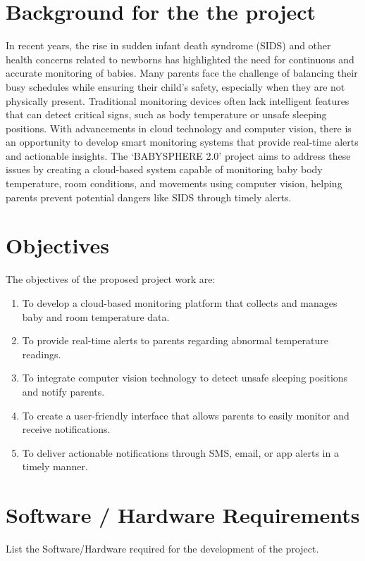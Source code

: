\documentclass[12pt,a4paper]{report}
\begin{document}
\section*{Background for the  the project}
In recent years\cite{banerjee2002minimum}, the rise in sudden infant death syndrome (SIDS)
 and other health concerns related to newborns has highlighted 
 the need for continuous and accurate monitoring of babies. 
 Many parents face the challenge of balancing their busy 
 schedules while ensuring their child’s safety, especially when 
 they are not physically present. Traditional monitoring devices
  often lack intelligent features that can detect critical signs,
   such as body temperature or unsafe sleeping positions. With 
   advancements in cloud technology and computer vision, there 
   is an opportunity to develop smart monitoring systems that 
   provide real-time alerts and actionable insights. The 
   `BABYSPHERE 2.0' project aims to address these issues by 
   creating a cloud-based system capable of monitoring baby 
   body temperature, room conditions, and movements using 
   computer vision, helping parents prevent potential dangers 
   like SIDS through timely alerts.

\section*{Objectives }
The objectives of the proposed project work are:
\begin{enumerate}
    \item To develop a cloud-based monitoring platform that collects and manages baby and room temperature data.
    \item To provide real-time alerts to parents regarding abnormal temperature readings.
    \item To integrate computer vision technology to detect unsafe sleeping positions and notify parents.
    \item To create a user-friendly interface that allows parents to easily monitor and receive notifications.
    \item To deliver actionable notifications through SMS, email, or app alerts in a timely manner.
\end{enumerate}


\section*{Software / Hardware Requirements}
List the Software/Hardware required for the development of the project. 
\end{document}
